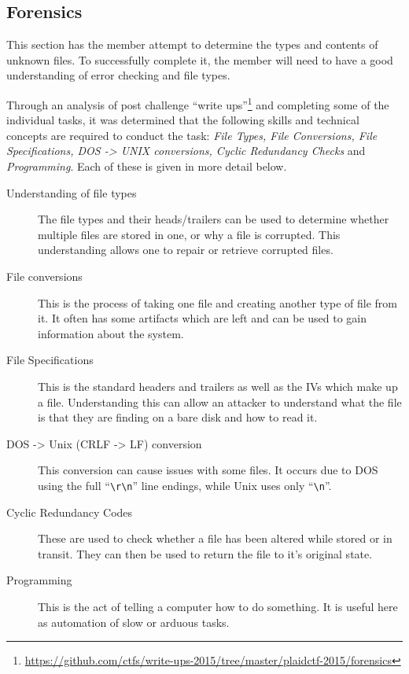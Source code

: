 \documentclass[a4paper,11pt]{report}
\begin{document}
		\subsection{Forensics}
			This section has the member attempt to determine the types and contents of unknown files. 
			To successfully complete it, the member will need to have a good understanding of error checking and file types. 

			Through an analysis of post challenge ``write ups''\footnote{\url{https://github.com/ctfs/write-ups-2015/tree/master/plaidctf-2015/forensics}}
			and completing some of the individual tasks, 
			it was determined that the following skills and technical concepts are required to conduct the task: 
			\textit{File Types, File Conversions, File Specifications, DOS -> UNIX conversions, Cyclic Redundancy Checks} and \textit{Programming}.
			Each of these is given in more detail below. 
			\begin{description}
				\item[Understanding of file types] 
					The file types and their heads/trailers can be used to determine whether multiple files are stored in one, or why a file is corrupted. 
					This understanding allows one to repair or retrieve corrupted files.
				\item[File conversions] 
					This is the process of taking one file and creating another type of file from it. 
					It often has some artifacts which are left and can be used to gain information about the system. 
				\item[File Specifications]
					This is the standard headers and trailers as well as the IVs which make up a file. 
					Understanding this can allow an attacker to understand what the file is that they are finding on a bare disk and how to read it. 
				\item[DOS -> Unix (CRLF -> LF) conversion]
					This conversion can cause issues with some files. 
					It occurs due to DOS using the full ``\verb+\r\n+'' line endings, while Unix uses only ``\verb+\n+''. 
				\item[Cyclic Redundancy Codes]
					These are used to check whether a file has been altered while stored or in transit. 
					They can then be used to return the file to it's original state. 
				\item[Programming]
					This is the act of telling a computer how to do something. 
					It is useful here as automation of slow or arduous tasks. 
			\end{description}
\end{document}
